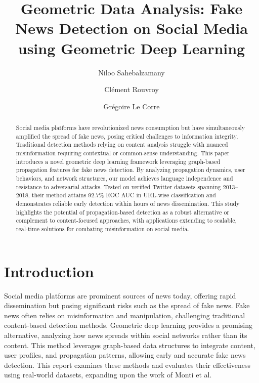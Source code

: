 \documentclass[sigconf,nonacm]{acmart}
\begin{document}
\title{Geometric Data Analysis: Fake News Detection on Social Media using Geometric Deep Learning\\
\vspace{0.5em}} %


\author{Niloo Sahebalzamany}

\author{Clément Rouvroy}

\author{Grégoire Le Corre}



\begin{abstract}
 Social media platforms have revolutionized news consumption but have simultaneously amplified the spread of fake news, posing critical challenges to information integrity. Traditional detection methods relying on content analysis struggle with nuanced misinformation requiring contextual or common-sense understanding. This paper introduces a novel geometric deep learning framework leveraging graph-based propagation features for fake news detection. By analyzing propagation dynamics, user behaviors, and network structures, our model achieves language independence and resistance to adversarial attacks. Tested on verified Twitter datasets spanning 2013–2018, their method attains 92.7\% ROC AUC in URL-wise classification and demonstrates reliable early detection within hours of news dissemination. This study highlights the potential of propagation-based detection as a robust alternative or complement to content-focused approaches, with applications extending to scalable, real-time solutions for combating misinformation on social media.
\end{abstract}

\maketitle

\section{Introduction}
Social media platforms are prominent sources of news today, offering rapid dissemination but posing significant risks such as the spread of fake news. Fake news often relies on misinformation and manipulation, challenging traditional content-based detection methods. Geometric deep learning provides a promising alternative, analyzing how news spreads within social networks rather than its content. This method leverages graph-based data structures to integrate content, user profiles, and propagation patterns, allowing early and accurate fake news detection. This report examines these methods and evaluates their effectiveness using real-world datasets, expanding upon the work of Monti et al. \cite{monti2019fakenewsdetectionsocial}
\end{document}
